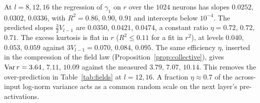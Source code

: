 At $l=8,12,16$ the regression of $\gamma_1$ on $r$ over the $1024$ neurons has slopes $0.0252$, $0.0302$, $0.0336$, with $R^2=0.86$, $0.90$,
$0.91$ and intercepts below $10^{-4}$. The predicted slopes $\frac32V_{l-1}$ are $0.0350$, $0.0421$, $0.0474$, a constant ratio
$\eta=0.72$, $0.72$, $0.71$. The excess kurtosis is flat in $r$ ($R^2\le0.11$ for a fit in $r^2$), at levels $0.040$, $0.053$, $0.059$ against
$3V_{l-1}=0.070$, $0.084$, $0.095$. The same efficiency $\eta$, inserted in the compression of the field law
(Proposition~\ref{prop:collective}), gives $\operatorname{Var} r=3.64$, $7.11$, $10.09$ against the measured $3.79$, $7.07$, $10.14$. This removes the
over-prediction in Table~\ref{tab:fields} at $l=12,16$. A fraction $\eta\approx0.7$ of the across-input log-norm variance acts as a common
random scale on the next layer's pre-activations.
